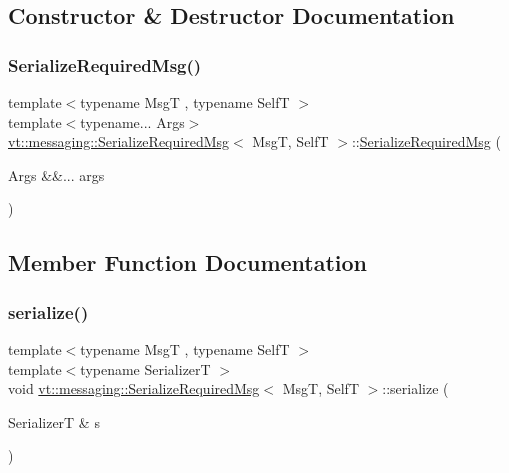 \subsection{Constructor \& Destructor Documentation}
\mbox{\label{structvt_1_1messaging_1_1_serialize_required_msg_af50357bbc47bf49c049442b6942a75ad}} 
\subsubsection{\texorpdfstring{Serialize\+Required\+Msg()}{SerializeRequiredMsg()}}
{\footnotesize\ttfamily template$<$typename MsgT , typename SelfT $>$ \\
template$<$typename... Args$>$ \\
\hyperlink{structvt_1_1messaging_1_1_serialize_required_msg}{vt\+::messaging\+::\+Serialize\+Required\+Msg}$<$ MsgT, SelfT $>$\+::\hyperlink{structvt_1_1messaging_1_1_serialize_required_msg}{Serialize\+Required\+Msg} (\begin{DoxyParamCaption}\item[{Args \&\&...}]{args }\end{DoxyParamCaption})\hspace{0.3cm}{\ttfamily [inline]}}



\subsection{Member Function Documentation}
\mbox{\label{structvt_1_1messaging_1_1_serialize_required_msg_a2e27ae5612c1b78ea9fd982c88f415b0}} 
\subsubsection{\texorpdfstring{serialize()}{serialize()}}
{\footnotesize\ttfamily template$<$typename MsgT , typename SelfT $>$ \\
template$<$typename SerializerT $>$ \\
void \hyperlink{structvt_1_1messaging_1_1_serialize_required_msg}{vt\+::messaging\+::\+Serialize\+Required\+Msg}$<$ MsgT, SelfT $>$\+::serialize (\begin{DoxyParamCaption}\item[{SerializerT \&}]{s }\end{DoxyParamCaption})\hspace{0.3cm}{\ttfamily [inline]}}



